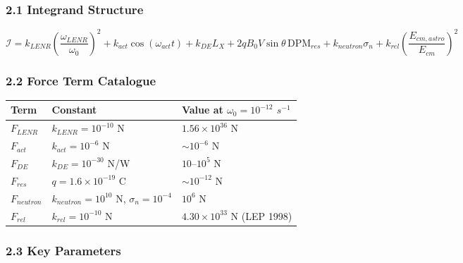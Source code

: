 \documentclass[
  11pt,
]{article}
\newcounter{none} %
\begin{document}
\subsubsection{2.1 Integrand Structure}\label{integrand-structure}

\[\mathcal{I} = k_{LENR}\left(\frac{\omega_{LENR}}{\omega_0}\right)^{2} + k_{act}\cos(\omega_{act}t) + k_{DE}L_X + 2qB_0 V\sin\theta\,\mathrm{DPM}_{res} + k_{neutron}\sigma_n + k_{rel}\left(\frac{E_{cm,astro}}{E_{cm}}\right)^{2}\]

\subsubsection{2.2 Force Term Catalogue}\label{force-term-catalogue}

{\def\LTcaptype{none} %
\begin{longtable}[]{@{}
  >{\raggedright\arraybackslash}p{}
  >{\raggedright\arraybackslash}p{}
  >{\raggedright\arraybackslash}p{}@{}}
\toprule\noalign{}
\begin{minipage}[b]{\linewidth}\raggedright
Term
\end{minipage} & \begin{minipage}[b]{\linewidth}\raggedright
Constant
\end{minipage} & \begin{minipage}[b]{\linewidth}\raggedright
Value at \(\omega_0=10^{-12}\) \(s^{-1}\)
\end{minipage} \\
\midrule\noalign{}
\endhead
\bottomrule\noalign{}
\endlastfoot
\(F_{LENR}\) & \(k_{LENR} = 10^{-10}\) N & \(1.56 \times 10^{36}\) N \\
\(F_{act}\) & \(k_{act} = 10^{-6}\) N & \(\sim 10^{-6}\) N \\
\(F_{DE}\) & \(k_{DE} = 10^{-30}\) N/W & \(10\)--\(10^5\) N \\
\(F_{res}\) & \(q = 1.6 \times 10^{-19}\) C & \(\sim 10^{-12}\) N \\
\(F_{neutron}\) & \(k_{neutron} = 10^{10}\) N, \(\sigma_n = 10^{-4}\) &
\(10^6\) N \\
\(F_{rel}\) & \(k_{rel} = 10^{-10}\) N & \(4.30 \times 10^{33}\) N (LEP
1998) \\
\end{longtable}
}

\subsubsection{2.3 Key Parameters}\label{key-parameters}
\end{document}

